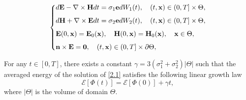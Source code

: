 \documentclass[10pt,a4paper]{amsart}
\begin{document}
\begin{equation}\label{2.1}	
\left \{
\begin{split}
		&{\rm d}{\bf E}-\nabla\times{\bf H} {\rm d}t=\sigma_{1}{\bf{e}}{\rm d}W_1(t),\quad (t,{\bf x})\in(0,T]\times\Theta,\\[1.5mm]
		&{\rm d}{\bf H}+\nabla\times{\bf E} {\rm d}t=\sigma_{2}{\bf{e}}{\rm d}W_2(t),\quad (t,{\bf x})\in(0,T]\times\Theta,\\[1.5mm]
		&{\bf E}(0,{\bf x})={\bf E}_0({\bf x}),\quad{\bf H}(0,{\bf x})={\bf H}_0({\bf x}),\quad {\bf x}\in\Theta,\\[1.5mm]
		&{\bf n}\times{\bf E}={\bf 0},\quad (t,{\bf x})\in(0,T]\times\partial\Theta,
\end{split}\right.
\end{equation}

\begin{theorem}\label{theorem2.3}
For any $t\in[0,T]$, there exists a constant $\gamma=3(\sigma_1^2+\sigma_2^2)|\Theta|$ such that the averaged energy of the solution of \eqref{2.1} satisfies the following linear growth law
		$$\mathcal{E}\left[\Phi \left(t\right)\right]=\mathcal{E}\left[\Phi \left(0\right)\right]+\gamma t,$$
where $|\Theta|$ is the volume of domain $\Theta$.
\end{theorem}
\end{document}
